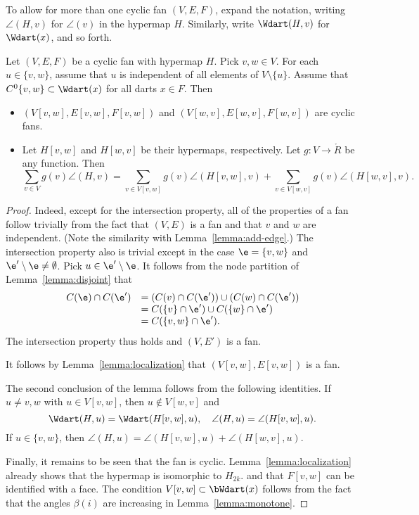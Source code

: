 To allow for more than one cyclic fan $(V,E,F)$,  expand the notation, writing $\angle(H,v)$ for $\angle(v)$ in the hypermap $H$.  Similarly, write $\Wdart(H,v)$ for $\Wdart(x)$, and so forth.
%
%


\begin{lemma}[slicing]  Let $(V,E,F)$ be a cyclic fan with hypermap $H$.  Pick $v,w\in V$. For each $u\in \{v,w\}$, assume that $u$ is independent of all elements of $V\setminus\{u\}$.    Assume that $C^0\{v,w\}\subset \Wdart(x)$ for all darts $x\in F$.  Then
\begin{itemize}
\item $(V[v,w],E[v,w],F[v,w])$ and $(V[w,v],E[w,v],F[w,v])$ are cyclic fans.  
\item Let $H[v,w]$ and $H[w,v]$ be their hypermaps, respectively.  Let $g:V\to\ring{R}$ be any function.  Then
$$
\sum_{v\in V} g(v)\angle(H,v) = \sum_{v\in V[v,w]}g(v)\angle(H[v,w],v) + \sum_{v\in V[w,v]}g(v)\angle(H[w,v],v).
$$
\end{itemize}
\end{lemma}
%
%

\begin{proof} 
 Indeed, except for the intersection property, all of the properties of a fan follow trivially from the fact that $(V,E)$ is a fan and
that $v$ and $w$ are independent.  (Note the similarity with Lemma~\ref{lemma:add-edge}.)
The intersection property also is trivial except in the case $\e=\{v,w\}$ and $\e'\setminus \e\ne \emptyset$.  Pick $u\in \e'\setminus\e$.  It follows from the node
partition of Lemma~\ref{lemma:disjoint} that
$$
\begin{array}{lll}
C(\e) \cap C(\e') &= (C(v) \cap C(\e')) \cup (C(w)\cap C(\e')) \\
 &= C(\{v\}\cap \e') \cup C(\{w\}\cap \e') \\
 &= C(\{v,w\}\cap \e').
\end{array}
$$
The intersection property thus holds and $(V,E')$ is a fan.

It follows by Lemma~\ref{lemma:localization} that $(V[v,w],E[v,w])$ is a fan.

The second conclusion of the lemma follows from the following identities.
If $u\ne v,w$ with $u\in V[v,w]$, then $u\not\in V[w,v]$ and 
\begin{equation}
\Wdart(H,u)=\Wdart(H[v,w],u),\quad \angle(H,u) = \angle(H[v,w],u).
\end{equation}
If $u\in\{v,w\}$, then 
$\angle(H,u)=\angle(H[v,w],u) +\angle(H[w,v],u)$.

Finally, it remains to be seen that the fan is cyclic.  Lemma~\ref{lemma:localization} already shows that the hypermap is isomorphic to $H_{2k}$. and that $F[v,w]$ can be identified with a face.  The condition $V[v,w]\subset \bWdart(x)$ follows from the fact that the angles $\beta(i)$ are increasing in Lemma~\ref{lemma:monotone}.
\end{proof}

